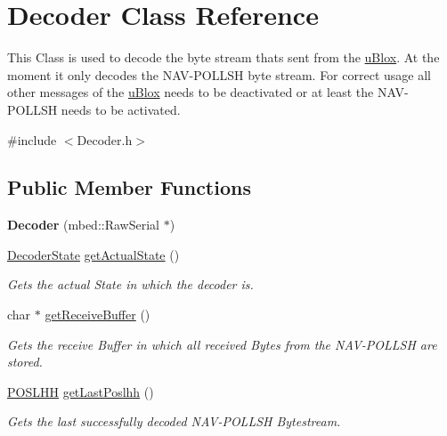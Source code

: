 \hypertarget{class_decoder}{}\section{Decoder Class Reference}
\label{class_decoder}


This Class is used to decode the byte stream thats sent from the \hyperlink{classu_blox}{u\+Blox}. At the moment it only decodes the N\+A\+V-\/\+P\+O\+L\+L\+S\+H byte stream. For correct usage all other messages of the \hyperlink{classu_blox}{u\+Blox} needs to be deactivated or at least the N\+A\+V-\/\+P\+O\+L\+L\+S\+H needs to be activated.  




{\ttfamily \#include $<$Decoder.\+h$>$}

\subsection*{Public Member Functions}
\begin{DoxyCompactItemize}
\item 
\hypertarget{class_decoder_afbb216d45d750f0690b770ac05de47c8}{}{\bfseries Decoder} (mbed\+::\+Raw\+Serial $\ast$)\label{class_decoder_afbb216d45d750f0690b770ac05de47c8}

\item 
\hyperlink{_decoder_8h_ae93428308fdd9a41c5c4e3b313660d5d}{Decoder\+State} \hyperlink{class_decoder_aa40ea5002429be768f098c8552bdbbd0}{get\+Actual\+State} ()
\begin{DoxyCompactList}\small\item\em Gets the actual State in which the decoder is. \end{DoxyCompactList}\item 
char $\ast$ \hyperlink{class_decoder_ac3387c24fad19dc2ad1030f6dd64f326}{get\+Receive\+Buffer} ()
\begin{DoxyCompactList}\small\item\em Gets the receive Buffer in which all received Bytes from the N\+A\+V-\/\+P\+O\+L\+L\+S\+H are stored. \end{DoxyCompactList}\item 
\hyperlink{struct_p_o_s_l_h_h}{P\+O\+S\+L\+H\+H} \hyperlink{class_decoder_a49a5192ad6bbe9aef721c4b6122aefc5}{get\+Last\+Poslhh} ()
\begin{DoxyCompactList}\small\item\em Gets the last successfully decoded N\+A\+V-\/\+P\+O\+L\+L\+S\+H Bytestream. \end{DoxyCompactList}\end{DoxyCompactItemize}


